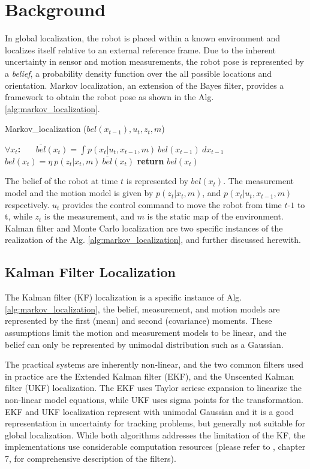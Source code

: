 \documentclass[10pt,journal,compsoc]{IEEEtran}
\begin{document}
\section{Background}

In global localization, the robot is placed within a known environment and localizes itself relative to an external reference frame. Due to the inherent uncertainty in sensor and motion measurements, the robot pose is represented by a \textit{belief}, a probability density function over the all possible locations and orientation.  Markov localization, an extension of the Bayes filter, provides a framework to obtain the robot pose as shown in the  Alg. \ref{alg:markov_localization}. 

\begin{algorithm}
\caption{Markov\_localization ($bel(x_{t-1}), u_t, z_t, m$)}\label{euclid}
\label{alg:markov_localization}
\begin{algorithmic}
\STATE  $\forall x_t$\textbf{:}
\STATE ~~~$\overline{bel}(x_t) = \int p(x_t | u_t, x_{t-1}, m)~bel(x_{t-1})~ dx_{t-1}$
\STATE ~~~$bel(x_t) = \eta~p(z_t | x_t, m)~\overline{bel}(x_t)$
\STATE \textbf{return} $bel(x_t)$
\end{algorithmic}
\end{algorithm}

The belief of the robot at time $t$ is represented by $bel(x_t)$. The measurement model and the motion model is given by $p(z_t | x_t, m)$, and $p(x_t | u_t, x_{t-1}, m)$ respectively. $u_t$ provides the control command to move the robot from time $t$-$1$ to t, while $z_t$ is the measurement, and $m$ is the static map of the environment. Kalman filter and Monte Carlo localization are two specific instances of the realization of the Alg. \ref{alg:markov_localization}, and further discussed herewith.   

\subsection{Kalman Filter Localization}
\label{sub:kfl}

The Kalman filter (KF) localization is a specific instance of Alg. \ref{alg:markov_localization}, the belief, measurement, and motion models are represented by the first (mean) and second (covariance) moments.  These assumptions limit the motion and measurement models to be linear, and the belief can only be represented by unimodal distribution such as a Gaussian. 

The practical systems are inherently non-linear, and the two common filters used in practice are the Extended Kalman filter (EKF), and the Unscented Kalman filter (UKF) localization. The EKF uses Taylor seriese expansion to linearize the non-linear model equations, while UKF uses sigma points for the transformation.  EKF and UKF localization represent with unimodal Gaussian and it is a good representation in uncertainty  for tracking problems, but generally not suitable for global localization. While  both algorithms addresses the limitation of the KF, the implementations use considerable computation resources (please refer to \cite{Thrun:2005:PR:1121596}, chapter 7, for comprehensive description of the filters).   
\end{document}
